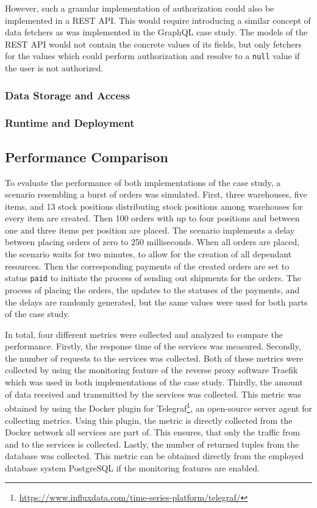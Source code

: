 However, such a granular implementation of authorization could also be implemented in a \ac{REST} \ac{API}.
This would require introducing a similar concept of data fetchers as was implemented in the GraphQL case study.
The models of the \ac{REST} \ac{API} would not contain the concrete values of its fields, but only fetchers for the values which could perform authorization and resolve to a \texttt{null} value if the user is not authorized. 

\subsubsection{Data Storage and Access}\label{sec:comp-data}

\subsubsection{Runtime and Deployment}\label{sec:comp-runtime}

\subsection{Performance Comparison}

To evaluate the performance of both implementations of the case study, a scenario resembling a burst of orders was simulated.
First, three warehouses, five items, and 13 stock positions distributing stock positions among warehouses for every item are created.
Then 100 orders with up to four positions and between one and three items per position are placed.
The scenario implements a delay between placing orders of zero to 250 milliseconds.
When all orders are placed, the scenario waits for two minutes, to allow for the creation of all dependant resources.
Then the corresponding payments of the created orders are set to status \texttt{paid} to initiate the process of sending out shipments for the orders.
The process of placing the orders, the updates to the statuses of the payments, and the delays are randomly generated, but the same values were used for both parts of the case study.

In total, four different metrics were collected and analyzed to compare the performance.
Firstly, the response time of the services was measured.
Secondly, the number of requests to the services was collected.
Both of these metrics were collected by using the monitoring feature of the reverse proxy software Traefik which was used in both implementations of the case study.
Thirdly, the amount of data received and transmitted by the services was collected.
This metric was obtained by using the Docker plugin for Telegraf\footnote{\url{https://www.influxdata.com/time-series-platform/telegraf/}}, an open-source server agent for collecting metrics.
Using this plugin, the metric is directly collected from the Docker network all services are part of.
This ensures, that only the traffic from and to the services is collected.
Lastly, the number of returned tuples from the database was collected.
This metric can be obtained directly from the employed database system PostgreSQL if the monitoring features are enabled.


